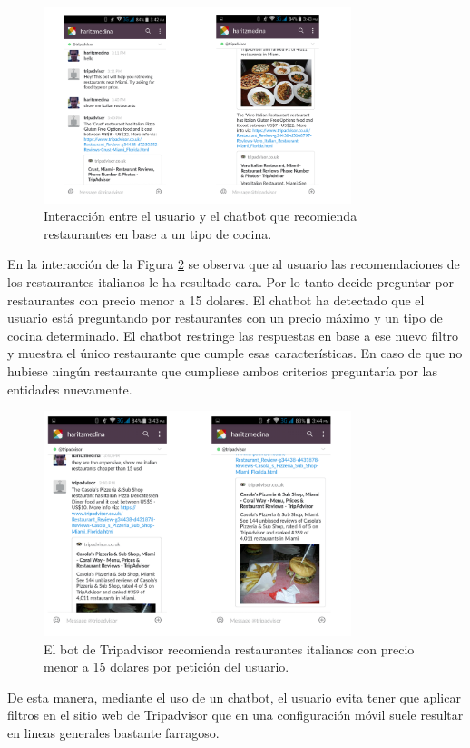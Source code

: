 \begin{figure}[htb]
	\centering
	\includegraphics[width=0.8\textwidth]{./figs/ejecucionTripadvisor1.png}
	\caption{Interacción entre el usuario y el chatbot que recomienda restaurantes en base a un tipo de cocina.}
	\label{fig:EjecucionTripadvisor1}
\end{figure}

En la interacción de la Figura \ref{fig:EjecucionTripadvisor2} se observa que al usuario las recomendaciones de los restaurantes italianos le ha resultado cara. Por lo tanto decide preguntar por restaurantes con precio menor a 15 dolares. El chatbot ha detectado que el usuario está preguntando por restaurantes con un precio máximo y un tipo de cocina determinado. El chatbot restringe las respuestas en base a ese nuevo filtro y muestra el único restaurante que cumple esas características. En caso de que no hubiese ningún restaurante que cumpliese ambos criterios preguntaría por las entidades nuevamente.

\begin{figure}[htb]
	\centering
	\includegraphics[width=0.8\textwidth]{./figs/ejecucionTripadvisor2.png}
	\caption{El bot de Tripadvisor recomienda restaurantes italianos con precio menor a 15 dolares por petición del usuario.}
	\label{fig:EjecucionTripadvisor2}
\end{figure}

De esta manera, mediante el uso de un chatbot, el usuario evita tener que aplicar filtros en el sitio web de Tripadvisor que en una configuración móvil suele resultar en lineas generales bastante farragoso.